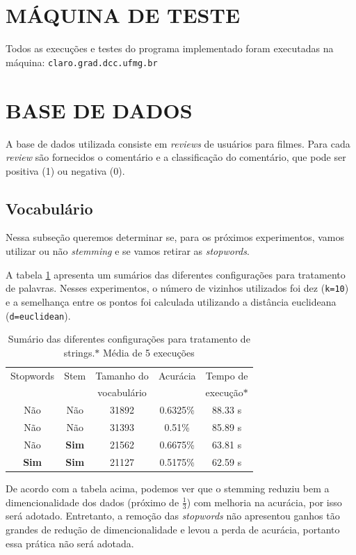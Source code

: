 \documentclass[a4paper, 11 pt, onecolumn]{article}   %
\begin{document}
\section{MÁQUINA DE TESTE}
Todos as execuções e testes do programa implementado foram executadas na máquina:
\texttt{claro.grad.dcc.ufmg.br}

\section{BASE DE DADOS}
\label{basededados}
A base de dados utilizada consiste em \textit{reviews} de usuários para filmes. Para cada \textit{review} são fornecidos o comentário e a classificação do comentário, que pode ser positiva (1) ou negativa (0).

\subsection{Vocabulário}

Nessa subseção queremos determinar se, para os próximos experimentos, vamos utilizar ou não \textit{stemming} e se vamos retirar as \textit{stopwords}. 

A tabela \ref{tab:string} apresenta um sumários das diferentes configurações para tratamento de palavras. Nesses experimentos, o número de vizinhos utilizados foi dez (\texttt{k=10}) e a semelhança entre os pontos foi calculada utilizando a distância euclideana (\texttt{d=euclidean}).

\begin{table}[htp!]
\centering
\begin{tabular}{c c| c | c c}
 Stopwords   & Stem & Tamanho do & Acurácia & Tempo de  \\
 & & vocabulário & & execução$*$\\ \hline
 Não & Não & 31892 &0.6325\% &88.33 s\\
Não & Não & 31393 & 0.51\% &85.89 s \\
Não & \textbf{Sim} & 21562 &0.6675\% &63.81 s\\
\textbf{Sim} & \textbf{Sim} & 21127 &0.5175\% &62.59 s \\
\end{tabular}
\caption{Sumário das diferentes configurações para tratamento de strings.\label{tab:string} $*$ Média de 5 execuções}
\end{table}

De acordo com a tabela acima, podemos ver que o stemming reduziu bem a dimencionalidade dos dados (próximo de $\frac{1}{3}$) com melhoria na acurácia, por isso será adotado. Entretanto, a remoção das \textit{stopwords} não apresentou ganhos tão grandes de redução de dimencionalidade e levou a perda de acurácia, portanto essa prática não será adotada.
\end{document}
